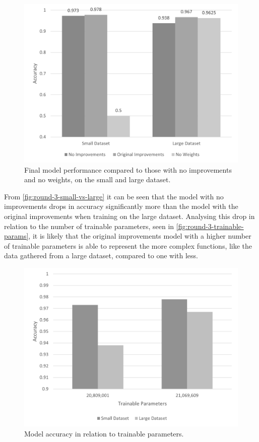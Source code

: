 \begin{figure}[H]
    \centering
    \includegraphics[width=\textwidth]{figures/round-3-small-vs-large.png}
    \caption{Final model performance compared to those with no improvements and no weights, on the small and large dataset.}
    \label{fig:round-3-small-vs-large}
\end{figure}

From \autoref{fig:round-3-small-vs-large} it can be seen that the model with no improvements drops in accuracy significantly more than the model with the original improvements when training on the large dataset. Analysing this drop in relation to the number of trainable parameters, seen in \autoref{fig:round-3-trainable-params}, it is likely that the original improvements model with a higher number of trainable parameters is able to represent the more complex functions, like the data gathered from a large dataset, compared to one with less.

\begin{figure}[H]
    \centering
    \includegraphics[width=\textwidth]{figures/round-3-trainable-params.png}
    \caption{Model accuracy in relation to trainable parameters.}
    \label{fig:round-3-trainable-params}
\end{figure}

